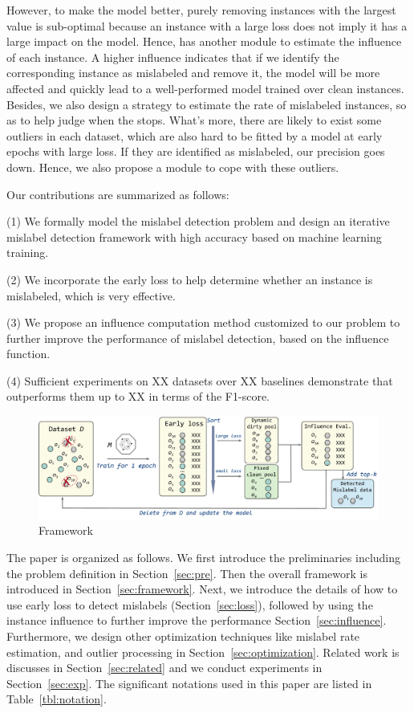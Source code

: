 However, to make the model better, purely removing instances with the largest value is sub-optimal because an instance with a large loss does not imply it has a large impact on the model. Hence, \sys has another module  to estimate the influence of each instance. A higher influence indicates that if we identify the corresponding instance as mislabeled and remove it, the model will be more affected and quickly lead to a well-performed model trained over clean instances. Besides, we also design a strategy to estimate the rate of mislabeled instances, so as to help judge when the \sys stops. What's more, there are likely to  exist some outliers in each dataset, which are also hard to be  fitted by a model at early epochs with large loss. If they are identified as mislabeled, our precision goes down. Hence, we also propose a module to cope with these outliers.


Our contributions are summarized as follows:

\noindent (1) We formally model the mislabel detection problem and  design an iterative mislabel detection framework \sys with high accuracy based on machine learning training.

\noindent (2) We incorporate the early loss to help determine whether an instance is mislabeled, which is very effective.

\noindent (3) We propose an influence computation method customized to our problem to further improve the performance of  mislabel detection, based on the influence function. 

\noindent (4) Sufficient experiments on XX datasets over XX baselines demonstrate that \sys outperforms them up to XX in terms of the F1-score.

\begin{figure}
	\centering
	\includegraphics[width=\textwidth]{figures/framework}
	\caption{\sys Framework}
	\label{fig:framework}
\end{figure}

The paper is organized as follows. We first introduce the preliminaries including the problem definition in Section~\ref{sec:pre}. Then the overall framework is introduced in  Section~\ref{sec:framework}. Next, we introduce the details of how to use early loss to detect mislabels (Section~\ref{sec:loss}), followed by using the instance influence to further improve the performance Section~\ref{sec:influence}. Furthermore, we design other optimization techniques like mislabel rate estimation, and outlier processing in Section~\ref{sec:optimization}. Related work is discusses in Section~\ref{sec:related} and we conduct experiments in Section~\ref{sec:exp}. The significant notations used in this paper are listed in Table~\ref{tbl:notation}.


